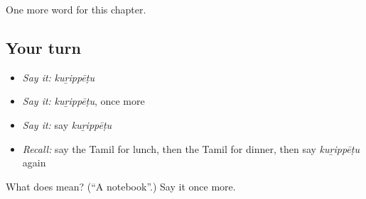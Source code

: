 \begin{grammarlens}[title={What you've built}]
One more word for this chapter.
\end{grammarlens}

\subsection*{Your turn}
\begin{itemize}
\raggedright
  \item \emph{Say it:} \emph{kuṟippēṭu}
  \item \emph{Say it:} \emph{kuṟippēṭu}, once more
  \item \emph{Say it:} say \emph{kuṟippēṭu}
  \item \emph{Recall:} say the Tamil for lunch, then the Tamil for dinner, then say \emph{kuṟippēṭu} again
\end{itemize}

\begin{tcolorbox}[breakable,colback=teal!4,colframe=teal!35!black,title={Before you move on}]
What does  mean? (\textquotedblleft{}A notebook\textquotedblright{}.) Say it once more.
\end{tcolorbox}
